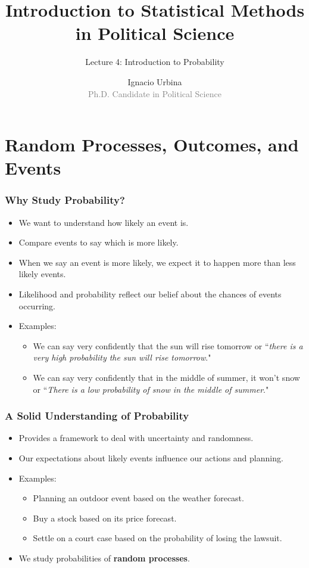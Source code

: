 \documentclass[handout]{beamer} %
\title{Introduction to Statistical Methods in Political Science}
\subtitle{Lecture 4: Introduction to Probability}
\author{Ignacio Urbina \texorpdfstring{\\ \vspace{0.3em}}{ } \scriptsize \textcolor{gray}{Ph.D. Candidate in Political Science}}
\date{}
\begin{document}
\frame{\titlepage}

\section{Random Processes, Outcomes, and Events}

\begin{frame}
    \frametitle{Why Study Probability?}
    \begin{itemize}
        \item We want to understand how likely an event is.
        \pause
        \item Compare events to say which is more likely.
        \pause
        \item When we say an event is more likely, we expect it to happen more than less likely events.
        \pause
        \item Likelihood and probability reflect our belief about the chances of events occurring.
        \pause
        \item Examples: 
        \begin{itemize}
            \item We can say very confidently that the sun will rise tomorrow or ``\emph{there is a very high probability the sun will rise tomorrow}." \pause
            \item We can say very confidently that in the middle of summer, it won't snow or ``\emph{There is a low probability of snow in the middle of summer}."
        \end{itemize}
    \end{itemize}
\end{frame}

\begin{frame}
    \frametitle{A Solid Understanding of Probability }
    \begin{itemize}
        \item Provides a framework to deal with uncertainty and randomness.
        \pause
        \item Our expectations about likely events influence our actions and planning.
        \pause
        \item Examples: 
        \begin{itemize}
            \item Planning an outdoor event based on the weather forecast. \pause
            \item Buy a stock based on its price forecast. \pause
            \item Settle on a court case based on the probability of losing the lawsuit. \pause
        \end{itemize}
    \item We study probabilities of \textbf{random processes}.
    \end{itemize}
\end{frame}
\end{document}
